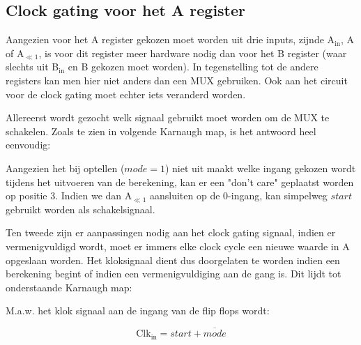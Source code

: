 \subsection{Clock gating voor het A register}

Aangezien voor het A register gekozen moet worden uit drie  inputs, zijnde A$_{\text{in}}$, A of A$_{\ll 1}$, is voor dit register meer hardware nodig dan voor het B register (waar slechts uit B$_{\text{in}}$ en B gekozen moet worden). In tegenstelling tot de andere registers kan men hier niet anders dan een MUX gebruiken. Ook aan het circuit voor de clock gating moet echter iets veranderd worden.

Allereerst wordt gezocht welk signaal gebruikt moet worden om de MUX te schakelen. Zoals te zien in volgende Karnaugh map, is het antwoord heel eenvoudig:



Aangezien het bij optellen ($mode = 1$) niet uit maakt welke ingang gekozen wordt tijdens het uitvoeren van de berekening, kan er een "don't care" geplaatst worden op positie 3. Indien we dan A$_{\ll 1}$ aansluiten op de 0-ingang, kan simpelweg $start$ gebruikt worden als schakelsignaal.

Ten tweede zijn er aanpassingen nodig aan het clock gating signaal, indien er vermenigvuldigd wordt, moet er immers elke clock cycle een nieuwe waarde in A opgeslaan worden. Het kloksignaal dient dus doorgelaten te worden indien een berekening begint of indien een vermenigvuldiging aan de gang is. Dit lijdt tot onderstaande Karnaugh map:


M.a.w. het klok signaal aan de ingang van de flip flops wordt:

\[ \text{Clk}_{\text{in}} = start + \overline{mode} \]
